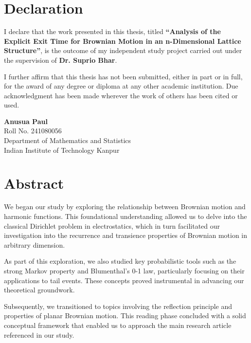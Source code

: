 \documentclass[11pt, a4paper, oneside]{report}
\numberwithin{equation}{section}
\newcommand{\ttitle}{Analysis of the Explicit Exit Time for Brownian Motion in an 
n-Dimensional Lattice Structure}
\newcommand{\authornames}{Anusua Paul}
\newcommand{\supnameA}{Dr. Suprio Bhar}
\newcommand{\univname}{Indian Institute of Technology Kanpur}
\newcommand{\deptname}{Department of Mathematics and Statistics}
\begin{document}
\chapter*{Declaration}

\noindent
I declare that the work presented in this thesis, titled \textbf{\enquote{\ttitle}}, is the outcome of my independent study project carried out under the supervision of \textbf{\supnameA}.

\medskip

I further affirm that this thesis has not been submitted, either in part or in full, for the award of any degree or diploma at any other academic institution. Due acknowledgment has been made wherever the work of others has been cited or used.

\vspace{2cm}

\noindent
\textbf{\authornames} \\
Roll No. 241080056 \\
\deptname \\
\univname



\chapter*{Abstract}

We began our study by exploring the relationship between Brownian motion and harmonic functions. This foundational understanding allowed us to delve into the classical Dirichlet problem in electrostatics, which in turn facilitated our investigation into the recurrence and transience properties of Brownian motion in arbitrary dimension.

\noindent As part of this exploration, we also studied key probabilistic tools such as the strong Markov property and Blumenthal’s 0-1 law, particularly focusing on their applications to tail events. These concepts proved instrumental in advancing our theoretical groundwork.

\noindent Subsequently, we transitioned to topics involving the reflection principle and properties of planar Brownian motion. This reading phase concluded with a solid conceptual framework that enabled us to approach the main research article referenced in our study.
\end{document}
